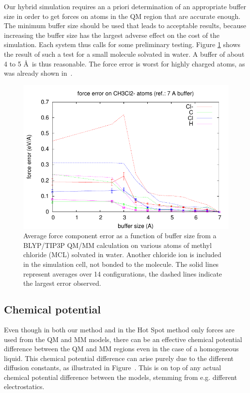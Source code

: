 \documentclass[11pt]{revtex4}
\begin{document}
Our hybrid simulation requires an a priori determination of an appropriate buffer size in order to get forces on atoms in the QM region that are accurate enough. The minimum buffer size should be used that leads to acceptable results, because increasing the buffer size has the largest adverse effect on the cost of the simulation. Each system thus calls for some preliminary testing. Figure \ref{MCLbuftest} shows the result of such a test for a small molecule solvated in water. A buffer of about 4 to 5 \AA\ is thus reasonable. The force error is worst for highly charged atoms, as was already shown in~\cite{solt_j_phys_chem_b_2009a}.

\begin{figure}
\includegraphics{force_error_MCL}
\caption{Average force component error as a function of buffer size from a BLYP/TIP3P QM/MM calculation on various atoms of methyl chloride (MCL) solvated in water. Another chloride ion is included in the simulation cell, not bonded to the molecule. The solid lines represent averages over 14 configurations, the dashed lines indicate the largest error observed. }
\label{MCLbuftest}
\end{figure}

\subsection{Chemical potential}

Even though in both our method and in the Hot Spot method only forces are used from the QM and MM models, there can be an effective chemical potential difference between the QM and MM regions even in the case of a homogeneous liquid. This chemical potential difference can arise purely due to the different diffusion constants, as illustrated in Figure~\cite{diffusion_sketch}. This is on top of any actual chemical potential difference between the models, stemming from e.g. different electrostatics. 
\end{document}
